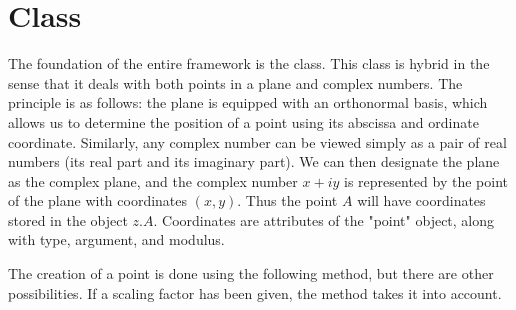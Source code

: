 \newpage

\section{Class } %
\label{sec:class_point}

The foundation of the entire framework is the  class. This class is hybrid in the sense that it deals with both points in a plane and complex numbers. The principle is as follows: the plane is equipped with an orthonormal basis, which allows us to determine the position of a point using its abscissa and ordinate coordinate. Similarly, any complex number can be viewed simply as a pair of real numbers (its real part and its imaginary part).  We can then designate the plane as the complex plane, and the complex number $x+iy$ is represented by the point of the plane with coordinates $(x,y)$. Thus the point $A$ will have coordinates stored in the object $z.A$. Coordinates are attributes of the "point" object,  along with type, argument, and modulus.



The creation of a point is done using the following method, but there are other possibilities. If a scaling factor has been given, the method takes it into account.

